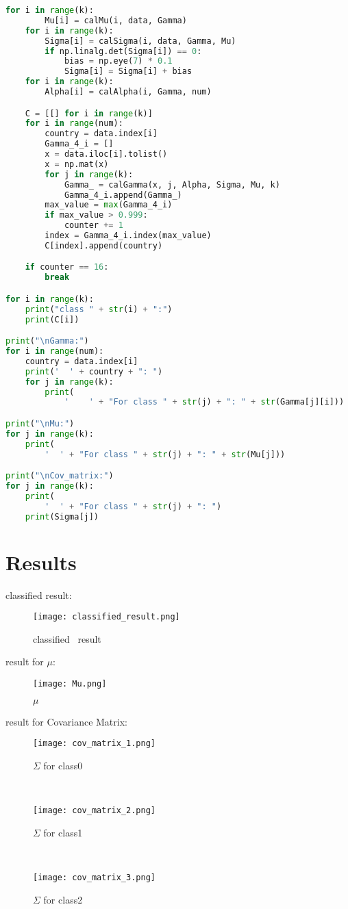 ﻿\documentclass[a4paper, 11pt]{article}
\numberwithin{equation}{subsection}
\begin{document}
\begin{lstlisting}[title = EM.py,language=Python,frame=single]
    for i in range(k):
        Mu[i] = calMu(i, data, Gamma)
    for i in range(k):
        Sigma[i] = calSigma(i, data, Gamma, Mu)
        if np.linalg.det(Sigma[i]) == 0:
            bias = np.eye(7) * 0.1
            Sigma[i] = Sigma[i] + bias
    for i in range(k):
        Alpha[i] = calAlpha(i, Gamma, num)

    C = [[] for i in range(k)]
    for i in range(num):
        country = data.index[i]
        Gamma_4_i = []
        x = data.iloc[i].tolist()
        x = np.mat(x)
        for j in range(k):
            Gamma_ = calGamma(x, j, Alpha, Sigma, Mu, k)
            Gamma_4_i.append(Gamma_)
        max_value = max(Gamma_4_i)
        if max_value > 0.999:
            counter += 1
        index = Gamma_4_i.index(max_value)
        C[index].append(country)

    if counter == 16:
        break

for i in range(k):
    print("class " + str(i) + ":")
    print(C[i])

print("\nGamma:")
for i in range(num):
    country = data.index[i]
    print('  ' + country + ": ")
    for j in range(k):
        print(
            '    ' + "For class " + str(j) + ": " + str(Gamma[j][i]))

print("\nMu:")
for j in range(k):
    print(
        '  ' + "For class " + str(j) + ": " + str(Mu[j]))

print("\nCov_matrix:")
for j in range(k):
    print(
        '  ' + "For class " + str(j) + ": ")
    print(Sigma[j])
\end{lstlisting}

\newpage
\section{Results}
classified result: \\
\begin{figure}[htbp]
\centering
\texttt{[image: classified\_result.png]}
\caption{classified \ result}
\end{figure}

\noindent result for $\mu$: \\
\begin{figure}[htbp]
\centering
\texttt{[image: Mu.png]}
\caption{$\mu$}
\end{figure}


\noindent result for Covariance Matrix:\\
\begin{figure}[h]
\centering
\texttt{[image: cov\_matrix\_1.png]}
\caption{$\Sigma$ for class0}
\end{figure}
 \
\begin{figure}[h]
\centering
\texttt{[image: cov\_matrix\_2.png]}
\caption{$\Sigma$ for class1}
\end{figure}
 \
\begin{figure}[h]
\centering
\texttt{[image: cov\_matrix\_3.png]}
\caption{$\Sigma$ for class2}
\end{figure}
\end{document}
